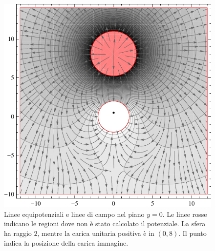 \begin{Es}
\[\]
\begin{figure}[htbp]
 \centering
 \includegraphics{immagini/fisica2/sfera_neutra}
 \caption{Linee equipotenziali e linee di campo nel piano $y=0$. Le linee rosse indicano le regioni dove non è stato calcolato il potenziale. La sfera ha raggio $2$, mentre la carica unitaria positiva è in $(0,8)$. Il punto indica la posizione della carica immagine.}
\end{figure}
\end{Es}

